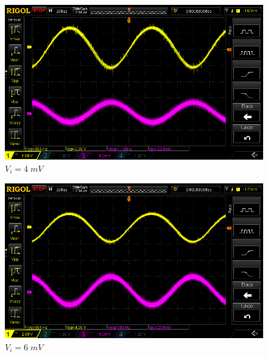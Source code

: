 \documentclass[uplatex,a4paper,11pt,oneside,openany]{jsbook}
\begin{document}
\begin{spacing}{0.71}
\begin{multicols}{2}
  \begin{figure}[H]
     \centering
      \includegraphics[keepaspectratio, scale=0.28, angle=0]
                  {rigol/figs/IOCharM1Y1_2kR/4mV.png}
                  \caption{$V_i=4\;mV$}
                  \label{fig:ioc4}
  \end{figure}

  \begin{figure}[H]
     \centering
      \includegraphics[keepaspectratio, scale=0.28, angle=0]
                {rigol/figs/IOCharM1Y1_2kR/6mV.png}
                \caption{$V_i=6\;mV$}
                \label{fig:ioc6}
  \end{figure}
\end{multicols}


\end{spacing}
\end{document}
